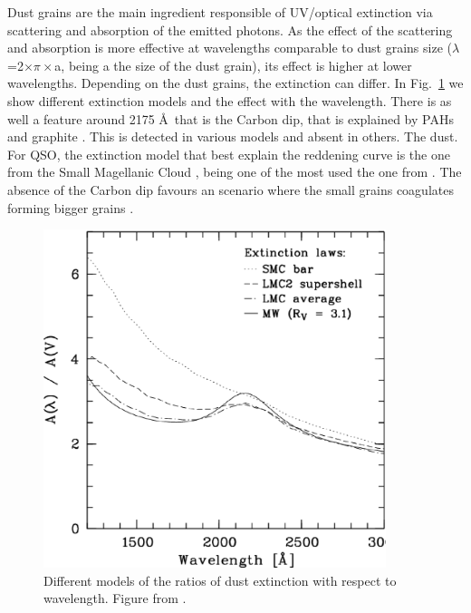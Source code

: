 Dust grains are the main ingredient responsible of UV/optical extinction via scattering and absorption of the emitted photons. As the effect of the scattering and absorption is more effective at wavelengths comparable to dust grains size ($\lambda$=2$\times \pi \times$a, being a the size of the dust grain), its effect is higher at lower wavelengths. Depending on the dust grains, the extinction can differ. In Fig.~\ref{sec1:fig_ao} we show different extinction models and the effect with the wavelength. There is as well a feature around 2175 \AA~that is the Carbon dip, that is explained by PAHs and graphite \citep{weingartner01}. This is detected in various models and absent in others. The dust. For QSO, the extinction model that best explain the reddening curve is the one from the Small Magellanic Cloud \citep{hopkins04}, being one of the most used the one from \cite{gordon03}. The absence of the Carbon dip favours an scenario where the small grains coagulates forming bigger grains \citep{maiolino01}.


 \begin{figure}
 \centering
 \includegraphics[width=10cm]{Chapter1_intro/ext.ps}
    \caption{Different models of the ratios of dust extinction with respect to wavelength. Figure from \cite{noll05}.}
 \label{sec1:fig_ao}
 \end{figure}




